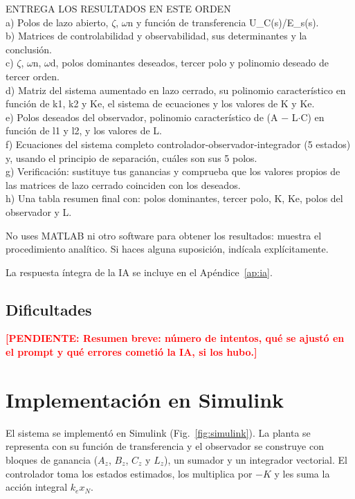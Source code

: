 \documentclass[conference]{IEEEtran}
\newcommand{\pendiente}[1]{\textcolor{red}{\textbf{[PENDIENTE: #1]}}}
\begin{document}
\begin{framed}
\smallskip\noindent ENTREGA LOS RESULTADOS EN ESTE ORDEN\\
a) Polos de lazo abierto, $\zeta$, $\omega$n y función de transferencia U\_C(s)/E\_s(s).\\
b) Matrices de controlabilidad y observabilidad, sus determinantes y la conclusión.\\
c) $\zeta$, $\omega$n, $\omega$d, polos dominantes deseados, tercer polo y polinomio deseado de tercer orden.\\
d) Matriz del sistema aumentado en lazo cerrado, su polinomio característico en función de k1, k2 y Ke, el sistema de ecuaciones y los valores de K y Ke.\\
e) Polos deseados del observador, polinomio característico de (A $-$ L$\cdot$C) en función de l1 y l2, y los valores de L.\\
f) Ecuaciones del sistema completo controlador-observador-integrador (5 estados) y, usando el principio de separación, cuáles son sus 5 polos.\\
g) Verificación: sustituye tus ganancias y comprueba que los valores propios de las matrices de lazo cerrado coinciden con los deseados.\\
h) Una tabla resumen final con: polos dominantes, tercer polo, K, Ke, polos del observador y L.

\smallskip\noindent No uses MATLAB ni otro software para obtener los resultados: muestra el procedimiento analítico. Si haces alguna suposición, indícala explícitamente.
\end{framed}

La respuesta íntegra de la IA se incluye en el Apéndice~\ref{ap:ia}.

\subsection{Dificultades}
\pendiente{Resumen breve: número de intentos, qué se ajustó en el prompt y qué errores cometió la IA, si los hubo.}

\section{Implementación en Simulink}

El sistema se implementó en Simulink (Fig.~\ref{fig:simulink}). La planta se representa con su función de transferencia y el observador se construye con bloques de ganancia ($A_z$, $B_z$, $C_z$ y $L_z$), un sumador y un integrador vectorial. El controlador toma los estados estimados, los multiplica por $-K$ y les suma la acción integral $k_e x_N$.
\end{document}
